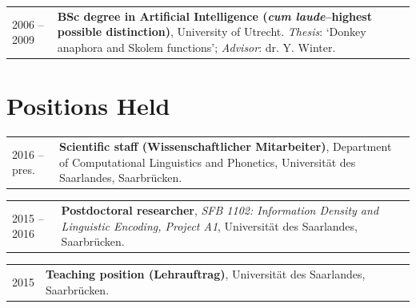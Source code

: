 \documentclass[a4paper,10pt]{article}
\def\leftcolwidth{.12\textwidth}
\def\tablevspace{10pt}
\begin{document}
\vspace{\tablevspace}

\noindent
\begin{tabularx}{\textwidth}{ p{\leftcolwidth} X }
  2006 -- 2009
  & \textbf{BSc degree in Artificial Intelligence 
    (\textit{cum laude}--highest possible distinction)}, University of Utrecht.
    \textit{Thesis}: `Donkey anaphora and Skolem functions'; \textit{Advisor}: 
    dr. Y. Winter.
\end{tabularx}


\section*{Positions Held}

\noindent
\begin{tabularx}{\textwidth}{ p{\leftcolwidth} X }
  2016 -- pres.
  & \textbf{Scientific staff (Wissenschaftlicher Mitarbeiter)}, Department of
    Computational Linguistics and Phonetics, Universit\"at des Saarlandes,
    Saarbr\"ucken.\\
\end{tabularx}

\vspace{\tablevspace}

\noindent
\begin{tabularx}{\textwidth}{ p{\leftcolwidth} X }
  2015 -- 2016 
  & \textbf{Postdoctoral researcher}, \textit{SFB 1102: Information Density and
    Linguistic Encoding, Project A1}, Universit\"at des Saarlandes,
    Saarbr\"ucken.\\
\end{tabularx}

\vspace{\tablevspace}

\noindent
\begin{tabularx}{\textwidth}{ p{\leftcolwidth} X }
  2015 
  & \textbf{Teaching position (Lehrauftrag)}, Universit\"at des
      Saarlandes, Saarbr\"ucken.\\
\end{tabularx}
\end{document}
